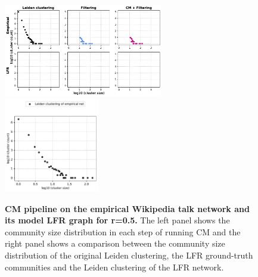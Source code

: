 \documentclass[a4paper]{article}   	%
\begin{document}
\begin{figure}[h!]
\centering
\includegraphics[width=0.62\textwidth]{figs/wiki_talk_cm_steps_lfr5.pdf}
\includegraphics[width=0.37\textwidth]{figs/wiki_talk_5_cm_size.pdf}
\caption[CM pipeline on the Wikipedia talk network and its model LFR graph for r=0.5]{\textbf{CM pipeline on the empirical Wikipedia talk network and its model LFR graph for r=0.5.} The left panel shows the community size distribution in each step of running CM and the right panel shows a comparison between the community size distribution of the original Leiden clustering, the LFR ground-truth communities and the Leiden clustering of the LFR network.}
\label{fig:wikitalk-cm-lfr-5}
\end{figure}
\clearpage


\end{document}
